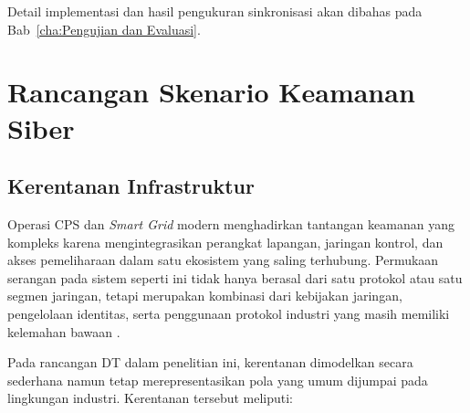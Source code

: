 Detail implementasi dan hasil pengukuran sinkronisasi akan dibahas pada Bab~\ref{cha:Pengujian dan Evaluasi}.


\section{Rancangan Skenario Keamanan Siber}
\label{sec:rancangan_skenario_keamanan_siber}

\subsection{Kerentanan Infrastruktur}
\label{subsec:kerentanan_infrastruktur}

Operasi \ac{CPS} dan \textit{Smart Grid} modern menghadirkan tantangan keamanan yang kompleks karena mengintegrasikan perangkat lapangan, jaringan kontrol, dan akses pemeliharaan dalam satu ekosistem yang saling terhubung. Permukaan serangan pada sistem seperti ini tidak hanya berasal dari satu protokol atau satu segmen jaringan, tetapi merupakan kombinasi dari kebijakan jaringan, pengelolaan identitas, serta penggunaan protokol industri yang masih memiliki kelemahan bawaan \citep{dennis2022implementation}.

Pada rancangan \ac{DT} dalam penelitian ini, kerentanan dimodelkan secara sederhana namun tetap merepresentasikan pola yang umum dijumpai pada lingkungan industri. Kerentanan tersebut meliputi:

